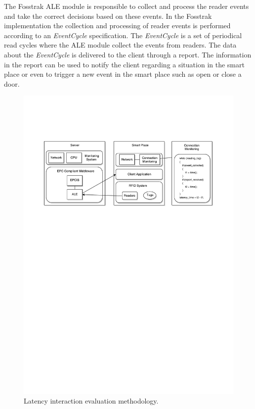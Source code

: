 The Fosstrak \gls{ALE} module is responsible to collect and process the reader events and take the
correct decisions based on these events. In the Fosstrak implementation the collection and processing
of reader events is performed according to an \textit{EventCycle} specification. The \textit{EventCycle}
is a set of periodical read cycles where the \gls{ALE} module collect the events from readers. The data
about the \textit{EventCycle} is delivered to the client through a report. The information in the report
can be used to notify the client regarding a situation in the smart place or even to trigger a new event
in the smart place such as open or close a door.\\

\begin{figure}[h!]
  \centering
  \includegraphics[width=\textwidth]{./images/eval_latency_methodology}
  \caption{Latency interaction evaluation methodology.}
  \label{fig:eval_latency_methodology}
\end{figure}

